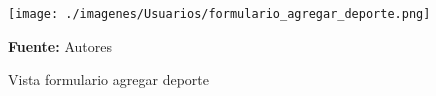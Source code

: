 \begin{figure}[!htb]
  \begin{center}
\texttt{[image: ./imagenes/Usuarios/formulario\_agregar\_deporte.png]}
    \caption{Vista formulario agregar deporte}
    \label{fig:Vista_formulario_agregar_deporte}
    \textbf{Fuente:}  Autores
  \end{center}
\end{figure}
